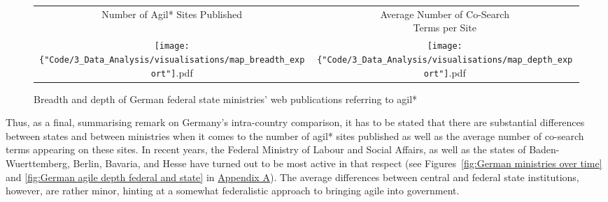 \begin{figure}[ht!]
	\centering
	\begin{tabular}{c c}
    Number of Agil* Sites Published & \makecell{Average Number of Co-Search \\ Terms per Site} \\
	\texttt{[image: \{"Code/3\_Data\_Analysis/visualisations/map\_breadth\_export"]}.pdf} &
	\texttt{[image: \{"Code/3\_Data\_Analysis/visualisations/map\_depth\_export"]}.pdf}
	\end{tabular}
	\setlength{\belowcaptionskip}{-10pt}
	\caption[Breadth and depth of German federal state ministries' web publications referring to agil*]{Breadth and depth of German federal state ministries' web publications referring to agil*}
	\label{fig:map}
\end{figure}

Thus, as a final, summarising remark on Germany's intra-country comparison, it has to be stated that there are substantial differences between states and between ministries when it comes to the number of agil* sites published as well as the average number of co-search terms appearing on these sites. In recent years, the Federal Ministry of Labour and Social Affairs, as well as the states of Baden-Wuerttemberg, Berlin, Bavaria, and Hesse have turned out to be most active in that respect (see Figures~\ref{fig:German ministries over time} and \ref{fig:German agile depth federal and state} in \hyperref[Appendix A]{Appendix A}). The average differences between central and federal state institutions, however, are rather minor, hinting at a somewhat federalistic approach to bringing agile into government.

